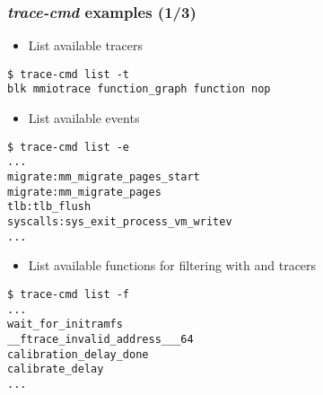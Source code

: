 \begin{frame}[fragile]
  \frametitle{{\em trace-cmd} examples (1/3)}
  \begin{itemize}
    \item List available tracers
  \end{itemize}
  \begin{block}{}
    \begin{verbatim}
$ trace-cmd list -t
blk mmiotrace function_graph function nop
    \end{verbatim}
  \end{block}
  \begin{itemize}
    \item List available events
  \end{itemize}
  \begin{block}{}
    \begin{verbatim}
$ trace-cmd list -e
...
migrate:mm_migrate_pages_start
migrate:mm_migrate_pages
tlb:tlb_flush
syscalls:sys_exit_process_vm_writev
...
    \end{verbatim}
  \end{block}
  
  \begin{itemize}
    \item List available functions for filtering with  and
         tracers
  \end{itemize}
  \begin{block}{}
    \begin{verbatim}
$ trace-cmd list -f
...
wait_for_initramfs
__ftrace_invalid_address___64
calibration_delay_done
calibrate_delay
...
    \end{verbatim}
  \end{block}
\end{frame}

